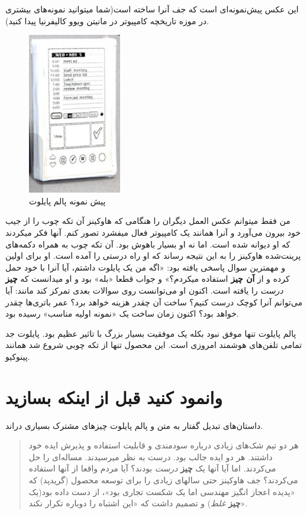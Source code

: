 این عکس پیش‌نمونه‌ای است که جف آنرا ساخته است(شما میتوانید نمونه‌های
بیشتری در موزه تاریخچه کامپیوتر در مانیتن ویوو کالیفرنیا پیدا کنید).

\begin{figure}[htbp]
\centering
\includegraphics{palmpilot.png}
\caption{پیش نمونه پالم پایلوت}
\end{figure}

من فقط میتوانم عکس العمل دیگران را هنگامی که هاوکینز آن تکه چوب را از
جیب خود بیرون می‌آورد و آنرا همانند یک کامپیوتر فعال میفشرد تصور کنم.
آنها فکر میکردند که او دیوانه شده است. اما نه او بسیار باهوش بود. آن تکه
چوب به همراه دکمه‌های پرینت‌شده هاوکینز را به این نتیجه رساند که او راه
درستی را آمده است. او برای اولین و مهمترین سوال پاسخی یافته بود: «اگه من
یک پایلوت داشتم، آیا آنرا با خود حمل کرده و از \textbf{آن چیز} استفاده
میکردم؟» و جواب قطعا «بله» بود و او میدانست که \textbf{چیز} \emph{درست}
را یافته است. اکنون او می‌توانست روی سوالات بعدی تمرکز کند مانند: آیا
می‌توانم آنرا کوچک درست کنیم؟ ساخت آن چقدر هزینه خواهد برد؟ عمر باتری‌ها
چقدر خواهد بود؟ اکنون زمان ساخت یک «نمونه اولیه مناسب» رسیده بود.

پالم پایلوت تنها موفق نبود بکله یک موفقیت بسیار بزرگ با تاثیر عظیم بود.
پایلوت جد تمامی تلفن‌های هوشمند امروزی است. این محصول تنها از تکه چوبی
شروع شد همانند پینوکیو.

\section{وانمود کنید قبل از اینکه
بسازید}\label{ux648ux627ux646ux645ux648ux62f-ux6a9ux646ux6ccux62f-ux642ux628ux644-ux627ux632-ux627ux6ccux646ux6a9ux647-ux628ux633ux627ux632ux6ccux62f}

داستان‌های تبدیل گفتار به متن و پالم پایلوت چیزهای مشترک بسیاری دراند.

\begin{quote}
هر دو تیم شک‌های زیادی درباره سودمندی و قابلیت استفاده و پذیرش ایده خود
داشتند. هر دو ایده جالب بود. درست به نظر میرسیدند. مساله‌ای را حل
می‌کردند. اما آیا آنها یک \textbf{چیز} \emph{درست} بودند؟ آیا مردم واقعا
از آنها استفاده می‌کردند؟ جف هاوکینز حتی سالهای زیادی را برای توسعه
محصول (گریدپد) که «پدیده اعجاز انگیز مهندسی اما یک شکست تجاری بود»، از
دست داده بود(یک \textbf{چیز} \emph{غلط}) و تصمیم داشت که «این اشتباه را
دوباره تکرار نکند».
\end{quote}

